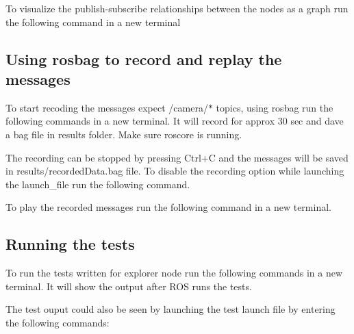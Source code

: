 To visualize the publish-\/subscribe relationships between the nodes as a graph run the following command in a new terminal 
\begin{DoxyCode}{0}
\end{DoxyCode}


\subsection*{Using rosbag to record and replay the messages}

To start recoding the messages expect /camera/$\ast$ topics, using rosbag run the following commands in a new terminal. It will record for approx 30 sec and dave a bag file in results folder. Make sure roscore is running. 
\begin{DoxyCode}{0}
\end{DoxyCode}
 The recording can be stopped by pressing Ctrl+C and the messages will be saved in results/recorded\+Data.\+bag file. To disable the recording option while launching the launch\+\_\+file run the following command. 
\begin{DoxyCode}{0}
\end{DoxyCode}


To play the recorded messages run the following command in a new terminal. 
\begin{DoxyCode}{0}
\end{DoxyCode}


\subsection*{Running the tests}

To run the tests written for explorer node run the following commands in a new terminal. It will show the output after R\+OS runs the tests. 
\begin{DoxyCode}{0}
\end{DoxyCode}
 The test ouput could also be seen by launching the test launch file by entering the following commands\+: 
\begin{DoxyCode}{0}
\end{DoxyCode}


